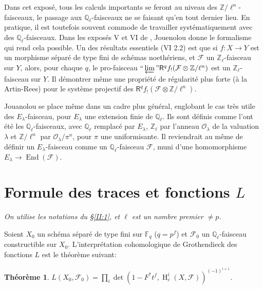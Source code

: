 \documentclass{book}
\DeclareMathOperator{\h}{H}
\newcommand{\cF}{\mathcal{F}}
\newcommand{\cO}{\mathcal{O}}
\newcommand{\dF}{\mathbb{F}}
\newcommand{\dQ}{\mathbb{Q}}
\newcommand{\dZ}{\mathbb{Z}}
\newcommand{\R}{\mathsf{R}}
\newtheorem{theorem_}[subsection]{Théorème}
\begin{document}
Dans cet exposé, tous les calculs importants se feront au niveau des 
$\dZ/\ell^n$-faisceaux, le passage aux $\dQ_\ell$-faisceaux ne se faisant qu'en 
tout dernier lieu. En pratique, il est toutefois souvent commode de travailler 
systématiquement avec des $\dQ_\ell$-faisceaux. Dans les exposés 
V et VI de \cite{SGA5}, Jouenolou donne le formalisme qui rend cela possible. 
Un des résultats essentiels (VI 2.2) est que si $f:X\to Y$ est un morphisme 
séparé de type fini de schémas noethériens, et $\cF$ un 
$\dZ_\ell$-faisceau sur $Y$, alors, pour chaque $q$, le pro-faisceau 
$\text{``}\varprojlim\text{''}\R^q f_! (\cF\otimes\dZ/\ell^n)$ est un 
$\dZ_\ell$-faisceau sur $Y$. Il démontrer même une propriété de 
régularité plus forte (à la Artin-Rees) pour le système projectif des 
$\R^q f_!(\cF\otimes\dZ/\ell^n)$. 

Jouanolou se place même dans un cadre plus général, englobant le cas 
très utile des $E_\lambda$-faisceau, pour $E_\lambda$ une extension finie de 
$\dQ_\ell$. Ils sont définis comme l'ont été les $\dQ_\ell$-faisceaux, 
avec $\dQ_\ell$ remplacé par $E_\lambda$, $\dZ_\ell$ par l'anneau 
$\cO_\lambda$ de la valuation $\lambda$ et $\dZ/\ell^n$ par 
$\cO_\lambda/\pi^n$, pour $\pi$ une uniformisante. Il reviendrait au même de 
définir un $E_\lambda$-faisceau comme un $\dQ_\ell$-faisceau $\cF$, muni 
d'une homomorphisme $E_\lambda\to\operatorname{End}(\cF)$. 










\section{Formule des traces et fonctions \texorpdfstring{$L$}{L}}\label{II:3}

\emph{On utilise les notations du \S\ref{II:1}, et $\ell$ est un nombre premier 
$\ne p$.}

Soient $X_0$ un schéma séparé de type fini sur $\dF_q$ ($q=p^f$) et 
$\cF_0$ un $\dQ_\ell$-faisceau constructible sur $X_0$. L'interprétation 
cohomologique de Grothendieck des fonctions $L$ est le théorème suivant: 





\begin{theorem_}\label{II:3-1}
$L(X_0,\cF_0) = \prod_i \det\left(1-F^* t^f, \h_c^i(X,\cF)\right)^{(-1)^{i+1}}$. 
\end{theorem_}
\end{document}
